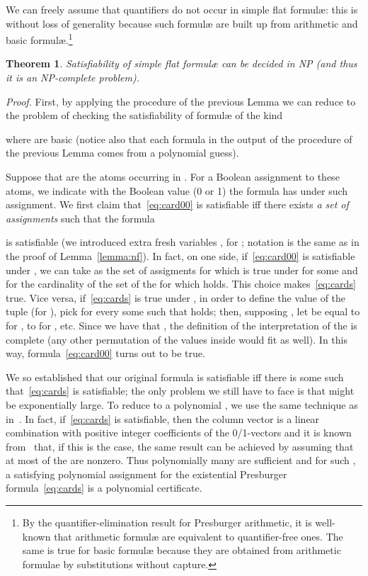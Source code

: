 \documentclass[11pt,a4paper]{article}
\newcommand{\formulae}{formul\ae\xspace}
\newtheorem{theorem}{Theorem}
\begin{document}
 

We can freely assume that quantifiers do not occur in simple flat  \formulae: this is without loss of generality because such \formulae are built up from 
arithmetic and basic \formulae.\footnote{ By the quantifier-elimination result for Presburger arithmetic, it is well-known that arithmetic \formulae 
are equivalent to quantifier-free ones. The same is true for basic \formulae  because they are obtained from arithmetic 
formulae by substitutions without capture. 
}

\begin{theorem}\label{thm:flatsimple}
 Satisfiability of simple flat  \formulae can be decided in NP (and thus it is an NP-complete problem).
\end{theorem}

\noindent
\textit{Proof.} 
 First, by applying the procedure of the 
 previous Lemma we can reduce to the problem of checking the satisfiability of \formulae of the kind
 
where  are basic
(notice also that each formula in the output of the procedure of the previous Lemma comes from a polynomial guess).

Suppose that  are the atoms occurring in 
. For a Boolean assignment  to these atoms, we indicate with  the Boolean value (0 or 1) the 
 formula  has under such assignment. We first claim that~\eqref{eq:card00} is satisfiable iff there exists \emph{a set of assignments}  such that the formula

is satisfiable (we introduced extra fresh variables , for ; notation  is the same as in the proof of Lemma~\ref{lemma:nf}).
In fact, on one side, if~\eqref{eq:card00} is satisfiable under , we can take as  the set of assigments for which 
is true under   for some  and for  the cardinality of the set of the  for which  holds.
This choice makes~\eqref{eq:cards} true. 
Vice versa, if~\eqref{eq:cards} is true under , in order to define the value of the tuple  (for ), pick for every  some  such that  
  holds; then, supposing , let  be equal to  for , to
   for , etc.
  Since we have that , the definition of the interpretation of the  is complete (any other permutation of the values 
   inside  would fit as well).
  In this way, formula~\eqref{eq:card00} turns out to be true.

We so established that our original formula is satisfiable iff there is some  such that~\eqref{eq:cards} is satisfiable;
the only problem we still have to face is that  might be exponentially 
large. To reduce to a polynomial , we use the same technique as in~\cite{cade21}. In fact, if~\eqref{eq:cards} is satisfiable, then the column vector  is a linear combination with positive integer coefficients of the 0/1-vectors 
and it is known from~\cite{ro} that, if this is the case, the same result can be achieved by assuming that at most  of the  are nonzero.  Thus polynomially many  are sufficient and
for such , a satisfying polynomial assignment for the existential Presburger formula~\eqref{eq:cards} is a polynomial certificate. 
 
\end{document}
